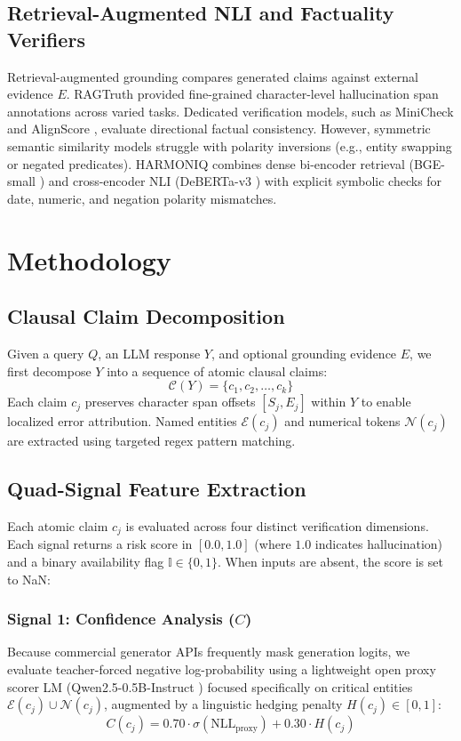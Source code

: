\documentclass[conference]{IEEEtran}
\begin{document}
\subsection{Retrieval-Augmented NLI and Factuality Verifiers}
Retrieval-augmented grounding compares generated claims against external evidence $E$.
RAGTruth \cite{b17_ragtruth} provided fine-grained character-level hallucination span annotations across varied tasks.
Dedicated verification models, such as MiniCheck \cite{b22_minicheck} and AlignScore \cite{b23_alignscore}, evaluate directional factual consistency.
However, symmetric semantic similarity models struggle with polarity inversions (e.g., entity swapping or negated predicates). 
HARMONIQ combines dense bi-encoder retrieval (BGE-small \cite{b14_bge}) and cross-encoder NLI (DeBERTa-v3 \cite{b20_deberta}) with explicit symbolic checks for date, numeric, and negation polarity mismatches.

\section{Methodology}

\subsection{Clausal Claim Decomposition}
Given a query $Q$, an LLM response $Y$, and optional grounding evidence $E$, we first decompose $Y$ into a sequence of atomic clausal claims:
\begin{equation}
    \mathcal{C}(Y) = \{ c_1, c_2, \dots, c_k \}
\end{equation}
Each claim $c_j$ preserves character span offsets $[S_j, E_j]$ within $Y$ to enable localized error attribution. 
Named entities $\mathcal{E}(c_j)$ and numerical tokens $\mathcal{N}(c_j)$ are extracted using targeted regex pattern matching.

\subsection{Quad-Signal Feature Extraction}
Each atomic claim $c_j$ is evaluated across four distinct verification dimensions. Each signal returns a risk score in $[0.0, 1.0]$ (where $1.0$ indicates hallucination) and a binary availability flag $\mathbb{I} \in \{0, 1\}$. When inputs are absent, the score is set to NaN:

\subsubsection{Signal 1: Confidence Analysis ($C$)}
Because commercial generator APIs frequently mask generation logits, we evaluate teacher-forced negative log-probability using a lightweight open proxy scorer LM (Qwen2.5-0.5B-Instruct \cite{b21_qwen}) focused specifically on critical entities $\mathcal{E}(c_j) \cup \mathcal{N}(c_j)$, augmented by a linguistic hedging penalty $H(c_j) \in [0, 1]$:
\begin{equation}
    C(c_j) = 0.70 \cdot \sigma(\text{NLL}_{\text{proxy}}) + 0.30 \cdot H(c_j)
\end{equation}
\end{document}
